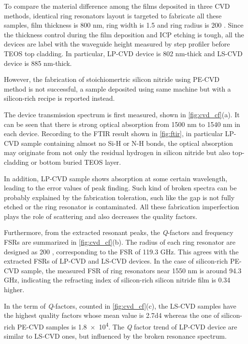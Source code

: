 To compare the material difference among the films deposited in three CVD methods, identical ring resonators layout is targeted to fabricate all these samples, film thickness is 800 nm, ring width is 1.5 \um and ring radius is 200 \um. %
Since the thickness control during the film deposition and ICP etching is tough, all the devices are label with the waveguide height measured by step profiler before TEOS top cladding. In particular, LP-CVD device is 802 nm-thick and LS-CVD device is 885 nm-thick.

However, the fabrication of stoichiomertric silicon nitride using PE-CVD 
\\method is not successful, a sample deposited using same machine but with a silicon-rich recipe is reported instead. 

The device transmission spectrum is first measured, shown in \autoref{fig:cvd_cf}(a). It can be seen that there is strong optical absorption from 1500 nm to 1540 nm in each device. 
Recording to the FTIR result shown in \autoref{fig:ftir}, in particular LP-CVD sample containing almost no Si-H or N-H bonds, 
the optical absorption may originate from not only the residual hydrogen in silicon nitride but also top-cladding or bottom buried TEOS layer. 

In addition, LP-CVD sample shows absorption at some certain wavelength, leading to the error values of peak finding. Such kind of broken spectra can be probably explained by the fabrication toleration, such like the gap is not fully etched or the ring resonator is contaminated. All these fabrication imperfection plays the role of scattering and also decreases the quality factors.

Furthermore, from the extracted resonant peaks, the \textit{Q}-factors and frequency FSRs are summarized in \autoref{fig:cvd_cf}(b). The radius of each ring resonator are designed as 200 \um, corresponding to the FSR of 119.3 GHz. This agrees with the extracted FSRs of LP-CVD and LS-CVD devices. In the case of silicon-rich PE-CVD sample, the measured FSR of ring resonators near 1550 nm is around 94.3 GHz, indicating the refracting index of silicon-rich silicon nitride film is 0.34 higher.

In the term of \textit{Q}-factors, counted in \autoref{fig:cvd_cf}(c), the LS-CVD samples have the highest quality factors whose mean value is \num{2.7d4} whereas the one of silicon-rich PE-CVD samples is \num{1.8e4}. The \textit{Q} factor trend of LP-CVD device are similar to LS-CVD ones, but influenced by the broken resonance spectrum.

